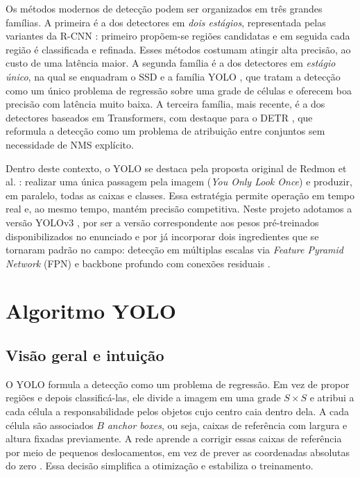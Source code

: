 \documentclass[11pt,a4paper]{article}
\begin{document}
Os métodos modernos de detecção podem ser organizados em três grandes famílias. A primeira é a dos detectores em \emph{dois estágios}, representada pelas variantes da R-CNN \cite{girshick2014rcnn,ren2015fasterrcnn}: primeiro propõem-se regiões candidatas e em seguida cada região é classificada e refinada. Esses métodos costumam atingir alta precisão, ao custo de uma latência maior. A segunda família é a dos detectores em \emph{estágio único}, na qual se enquadram o SSD \cite{liu2016ssd} e a família YOLO \cite{redmon2016yolo,redmon2018yolov3}, que tratam a detecção como um único problema de regressão sobre uma grade de células e oferecem boa precisão com latência muito baixa. A terceira família, mais recente, é a dos detectores baseados em Transformers, com destaque para o DETR \cite{carion2020detr}, que reformula a detecção como um problema de atribuição entre conjuntos sem necessidade de NMS explícito.

Dentro deste contexto, o YOLO se destaca pela proposta original de Redmon et al. \cite{redmon2016yolo}: realizar uma única passagem pela imagem (\textit{You Only Look Once}) e produzir, em paralelo, todas as caixas e classes. Essa estratégia permite operação em tempo real e, ao mesmo tempo, mantém precisão competitiva. Neste projeto adotamos a versão YOLOv3 \cite{redmon2018yolov3}, por ser a versão correspondente aos pesos pré-treinados disponibilizados no enunciado e por já incorporar dois ingredientes que se tornaram padrão no campo: detecção em múltiplas escalas via \emph{Feature Pyramid Network} (FPN) \cite{lin2017fpn} e backbone profundo com conexões residuais \cite{he2016resnet}.

\section{Algoritmo YOLO}

\subsection{Visão geral e intuição}

O YOLO formula a detecção como um problema de regressão. Em vez de propor regiões e depois classificá-las, ele divide a imagem em uma grade $S \times S$ e atribui a cada célula a responsabilidade pelos objetos cujo centro caia dentro dela. A cada célula são associados $B$ \emph{anchor boxes}, ou seja, caixas de referência com largura e altura fixadas previamente. A rede aprende a corrigir essas caixas de referência por meio de pequenos deslocamentos, em vez de prever as coordenadas absolutas do zero \cite{redmon2017yolov2}. Essa decisão simplifica a otimização e estabiliza o treinamento.
\end{document}
